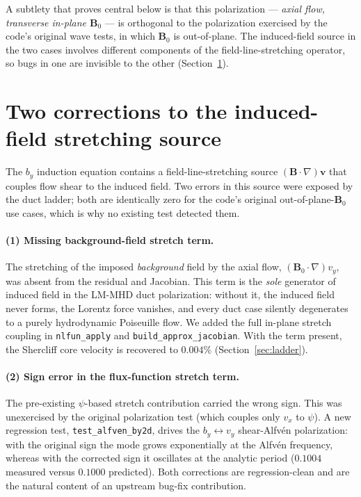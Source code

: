 \documentclass[11pt,letterpaper]{article}
\newcommand{\by}{b_y}
\begin{document}
A subtlety that proves central below is that this polarization --- \emph{axial
flow, transverse in-plane $\mathbf{B}_0$} --- is orthogonal to the polarization
exercised by the code's original wave tests, in which $\mathbf{B}_0$ is
out-of-plane. The induced-field source in the two cases involves different
components of the field-line-stretching operator, so bugs in one are invisible to
the other (Section~\ref{sec:bugs}).

\section{Two corrections to the induced-field stretching source}
\label{sec:bugs}
The $\by$ induction equation contains a field-line-stretching source
$(\mathbf{B}\!\cdot\!\nabla)\mathbf{v}$ that couples flow shear to the induced
field. Two errors in this source were exposed by the duct ladder; both are
identically zero for the code's original out-of-plane-$\mathbf{B}_0$ use cases,
which is why no existing test detected them.

\paragraph{(1) Missing background-field stretch term.}
The stretching of the imposed \emph{background} field by the axial flow,
$(\mathbf{B}_0\!\cdot\!\nabla)v_y$, was absent from the residual and Jacobian.
This term is the \emph{sole} generator of induced field in the LM-MHD duct
polarization: without it, the induced field never forms, the Lorentz force
vanishes, and every duct case silently degenerates to a purely hydrodynamic
Poiseuille flow. We added the full in-plane stretch coupling in \texttt{nlfun\_apply}
and \texttt{build\_approx\_jacobian}. With the term present, the Shercliff core
velocity is recovered to $0.004\%$ (Section~\ref{sec:ladder}).

\paragraph{(2) Sign error in the flux-function stretch term.}
The pre-existing $\psi$-based stretch contribution carried the wrong sign. This
was unexercised by the original polarization test (which couples only $v_x$ to
$\psi$). A new regression test, \texttt{test\_alfven\_by2d}, drives the
$\by\!\leftrightarrow\!v_y$ shear-Alfv\'en polarization: with the original sign the
mode grows exponentially at the Alfv\'en frequency, whereas with the corrected
sign it oscillates at the analytic period ($0.1004$ measured versus $0.1000$
predicted). Both corrections are regression-clean and are the natural content of an
upstream bug-fix contribution.
\end{document}
